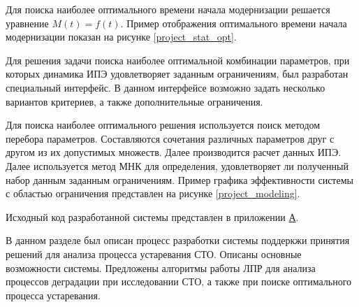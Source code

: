 
Для поиска наиболее оптимального времени начала модернизации решается уравнение $M(t)=f(t)$. 
Пример отображения оптимального времени начала модернизации показан на рисунке \ref{project_stat_opt}.

 
Для решения задачи поиска наиболее оптимальной комбинации параметров, при которых динамика ИПЭ удовлетворяет заданным ограничениям, был разработан специальный интерфейс. 
В данном интерфейсе возможно задать несколько вариантов критериев, а также дополнительные ограничения.

Для поиска наиболее оптимального решения используется поиск методом перебора параметров. 
Составляются сочетания различных параметров друг с другом из их допустимых множеств. 
Далее производится расчет данных ИПЭ. 
Далее используется метод МНК для определения, удовлетворяет ли полученный набор данным заданным ограничениям.
Пример графика эффективности системы с областью ограничения представлен на рисунке \ref{project_modeling}.


Исходный код разработанной системы представлен в приложении \hyperlink{app-a}{А}.

В данном разделе был описан процесс разработки системы поддеркжи принятия решений для анализа процесса устаревания СТО.
Описаны основные возможности системы. 
Предложены алгоритмы работы ЛПР для анализа процессов деградации при исследовании СТО, а также при поиске оптимального процесса устаревания.




